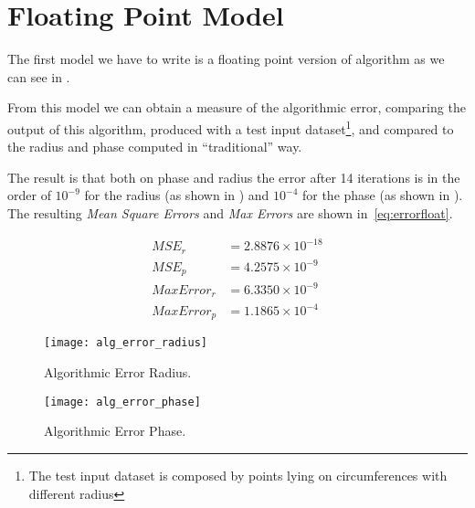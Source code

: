 \section{Floating Point Model}\label{sec:float}

The first model we have to write is a floating point version of \cordic{}
algorithm as we can see in .



From this model we can obtain a measure of the algorithmic error, comparing the
output of this algorithm, produced with a test input dataset\footnote{The test
input dataset is composed by points lying on circumferences with different
radius}, and compared to the radius and phase computed in ``traditional'' way.

The result is that both on phase and radius the error after 14 iterations is in
the order of \(10^{-9}\) for the radius (as shown in
) and \(10^{-4}\) for the phase (as shown in
). The resulting \emph{Mean Square Errors} and
\emph{Max Errors} are shown in~\eqref{eq:errorfloat}.

\begin{equation}\label{eq:errorfloat}
	\begin{array}{rl}
		MSE_r &= 2.8876\times10^{-18}\\
		MSE_p &= 4.2575\times10^{-9}\\
		MaxError_r &= 6.3350\times10^{-9}\\
		MaxError_p &= 1.1865\times10^{-4}
	\end{array}
\end{equation}

\begin{figure}[htb]
	\texttt{[image: alg\_error\_radius]}
	\caption{Algorithmic Error Radius.}\label{fig:floaterrorradius}
\end{figure}
\begin{figure}[htb]
	\texttt{[image: alg\_error\_phase]}
	\caption{Algorithmic Error Phase.}\label{fig:floaterrorphase}
\end{figure}
